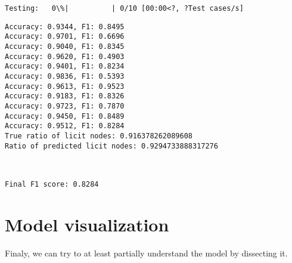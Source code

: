 \documentclass[11pt]{article}
\begin{document}
    
    \begin{Verbatim}[commandchars=\\\{\}]
Testing:   0\%|          | 0/10 [00:00<?, ?Test cases/s]
    \end{Verbatim}

    
    \begin{Verbatim}[commandchars=\\\{\}]
Accuracy: 0.9344, F1: 0.8495
Accuracy: 0.9701, F1: 0.6696
Accuracy: 0.9040, F1: 0.8345
Accuracy: 0.9620, F1: 0.4903
Accuracy: 0.9401, F1: 0.8234
Accuracy: 0.9836, F1: 0.5393
Accuracy: 0.9613, F1: 0.9523
Accuracy: 0.9183, F1: 0.8326
Accuracy: 0.9723, F1: 0.7870
Accuracy: 0.9450, F1: 0.8489
Accuracy: 0.9512, F1: 0.8284
True ratio of licit nodes: 0.916378262089608
Ratio of predicted licit nodes: 0.9294733888317276
    \end{Verbatim}

    \begin{center}
    \end{center}
    { \hspace*{\fill} \\}
    
    \begin{Verbatim}[commandchars=\\\{\}]
Final F1 score: 0.8284
    \end{Verbatim}

    \hypertarget{model-visualization}{%
\section{Model visualization}\label{model-visualization}}

Finaly, we can try to at least partially understand the model by
dissecting it.
\end{document}
